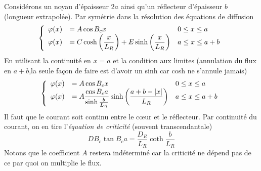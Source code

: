Considérons un noyau d'épaisseur $2a$ ainsi qu'un réflecteur d'épaisseur $b$ (longueur extrapolée). 
Par symétrie dans la résolution des équations de diffusion
\begin{equation}
\left\{\begin{array}{lll}
\varphi (x) &\displaystyle={A\cos {B_c}x \;\;}&{0 \le x \le a}\\
\varphi (x) &\displaystyle= {C\cosh \left( {\frac{x}{{{L_R}}}} \right) + E\sinh \left( {\frac{x}{{{L_R}}}} \right)}&{a \le x \le a + b}
\end{array}\right.
\end{equation}
En utilisant la continuité en $x=a$ et la condition aux limites (annulation du flux en $a+b$,la 
seule façon de faire est d'avoir un sinh car cosh ne s'annule jamais)
\begin{equation}
\left\{\begin{array}{lll}
\varphi (x) &\displaystyle= {A\cos {B_c}x\quad \quad \quad \quad \quad \quad \;\;}&{0 \le x \le a}\\
\varphi (x) &\displaystyle= {A\frac{{\cos {B_c}a}}{{\sinh {\textstyle{b \over {{L_R}}}}}}\sinh \left( {\frac{{a + b - |x|}}{{{L_R}}}} \right)}&{a \le x \le a + b}
\end{array}\right.
\end{equation}
Il faut que le courant soit continu entre le cœur et le réflecteur. Par continuité du courant, on en
tire l'\textit{équation de criticité} (souvent transcendantale)
\begin{equation}
D{B_c}\tan {B_c}a = \frac{{{D_R}}}{{{L_R}}}\coth \frac{b}{{{L_R}}}
\end{equation}
Notons que le coefficient $A$ restera indéterminé car la criticité ne dépend pas de ce par quoi on 
multiplie le flux.\\

